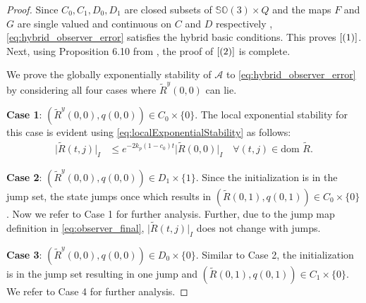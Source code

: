 \documentclass{article}
\newcommand{\dom}{\text{dom }}
\newcommand{\SOthree}{\mathbb{SO}(3)}
\newcommand{\Rtilde}{\tilde{R}}
\newcommand{\normSOthree}[1]{{{\vert}#1 {\vert}_I}}
\newcommand{\expo}[1]{e^{#1}}
\begin{document}
    \begin{proof}
         Since $C_0, C_1, D_0, D_1$ are closed subsets of ${\SOthree\times Q}$ and the maps $F$ and $G$ are single valued and continuous on $C$ and $D$ respectively , \eqref{eq:hybrid_observer_error} satisfies the hybrid basic conditions. This proves $\eqref{(1)}$. Next, using Proposition 6.10 from  \cite{hybridDynamicalSystems}, the proof of $\eqref{(2)}$ is complete. 
    
  We prove the globally exponentially stability of $\mathcal{A}$ to \eqref{eq:hybrid_observer_error} by considering all four cases where $\Rtilde^y(0,0)$ can lie. 

\textbf{Case 1}: ${(\Rtilde^y(0,0), q(0,0))} \in C_0\times \{0\}$. The local exponential stability for this case is evident using \eqref{eq:localExponentialStability} as follows:
\begin{align}\label{eq:C0bounds}
    \normSOthree{\Rtilde(t,j)} &\leq \expo{-2k_p(1-c_0)t}\normSOthree{\Rtilde(0,0)} \quad \forall (t,j) \in \dom\Rtilde.
\end{align}

    \textbf{Case 2}: ${(\Rtilde^y(0,0), q(0,0))}\in D_1\times\{1\}$. Since the initialization is in the jump set, the state jumps once which results in ${(\Rtilde(0,1), q(0,1))}\in C_0\times \{0\}$. Now we refer to Case 1 for further analysis. Further, due to the jump map definition in \eqref{eq:observer_final}, $\normSOthree{\Rtilde(t,j)}$ does not change with jumps.

    \textbf{Case 3}: ${(\Rtilde^y(0,0), q(0,0))}\in D_0\times\{0\}$. Similar to Case 2, the initialization is in the jump set resulting in one jump and ${(\Rtilde(0,1), q(0,1))}\in C_1\times\{0\}$. We refer to Case 4 for further analysis.


\end{proof}
\end{document}
